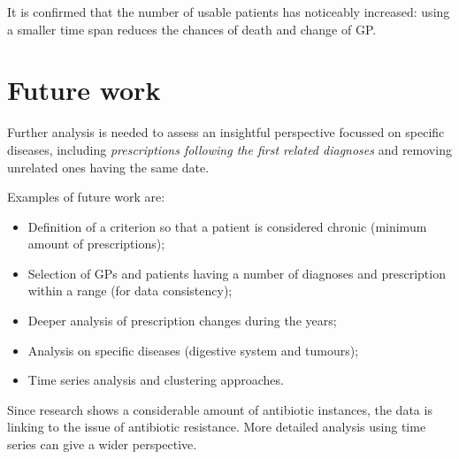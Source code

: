 It is confirmed that the number of usable patients has noticeably increased: using a smaller time span reduces the chances of death and change of GP.

\section{Future work}
Further analysis is needed to assess an insightful perspective focussed on specific diseases, including \textit{prescriptions following the first related diagnoses} and removing unrelated ones having the same date.

Examples of future work are:
\begin{itemize}
	\item Definition of a criterion so that a patient is considered chronic (minimum amount of prescriptions);
	\item Selection of GPs and patients having a number of diagnoses and prescription within a range (for data consistency);
	\item Deeper analysis of prescription changes during the years;
	\item Analysis on specific diseases (digestive system and tumours);
	\item Time series analysis and clustering approaches.
\end{itemize}

Since research shows a considerable amount of antibiotic instances, the data is linking to the issue of antibiotic resistance. More detailed analysis using time series can give a wider perspective.